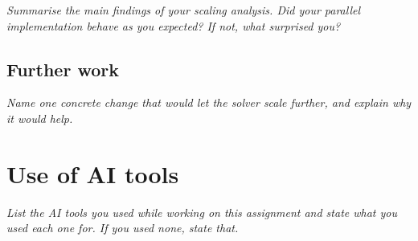 \documentclass[11pt]{article}
\newcommand{\prompt}[1]{{\itshape\color{gray}#1\par}\medskip}
\begin{document}
\prompt{Summarise the main findings of your scaling analysis. Did your parallel implementation
behave as you expected? If not, what surprised you?}

\subsection*{Further work}

\prompt{Name one concrete change that would let the solver scale further, and explain why it would
help.}

\appendix

\section{Use of AI tools}

\prompt{List the AI tools you used while working on this assignment and state what you used each
one for. If you used none, state that.}
\end{document}
